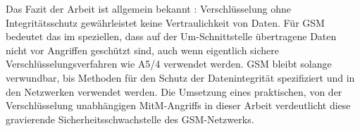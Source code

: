 Das Fazit der Arbeit ist allgemein bekannt \citep{yu2004perils}\citep{paterson2006cryptography}\citep{degabriele2007attacking}\citep{bittau2006final}: Verschlüsselung ohne Integritätsschutz gewährleistet keine Vertraulichkeit von Daten. Für \ac{GSM} bedeutet das im speziellen, dass auf der \ac{Um}-Schnittstelle übertragene Daten nicht vor Angriffen geschützt sind, auch wenn eigentlich sichere Verschlüsselungsverfahren wie A5/4 verwendet werden. \ac{GSM} bleibt solange verwundbar, bis Methoden für den Schutz der Datenintegrität spezifiziert und in den Netzwerken verwendet werden. Die Umsetzung eines praktischen, von der Verschlüsselung unabhängigen \ac{MitM}-Angriffs in dieser Arbeit verdeutlicht diese gravierende Sicherheitsschwachstelle des \ac{GSM}-Netzwerks.